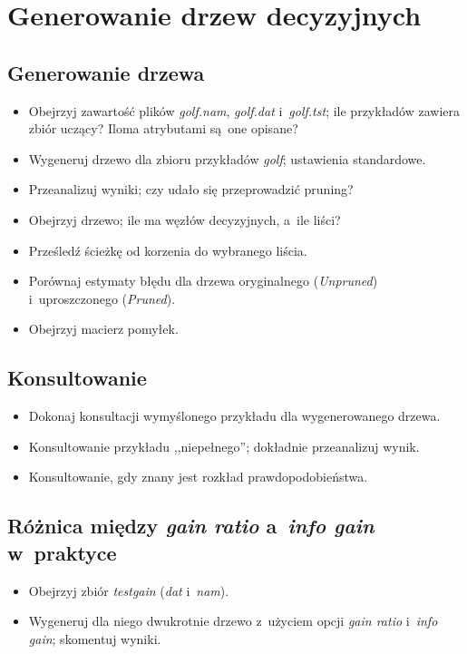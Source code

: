 \documentclass{article}
\begin{document}



\section{Generowanie drzew decyzyjnych}

\subsection{Generowanie drzewa}

\begin{itemize}
\item Obejrzyj zawartość plików \emph{golf.nam}, \emph{golf.dat} i~\emph{golf.tst}; ile przykładów zawiera zbiór uczący? Iloma atrybutami są~one opisane?
\item Wygeneruj drzewo dla zbioru przykładów \emph{golf}; ustawienia standardowe.
\item Przeanalizuj wyniki; czy udało się przeprowadzić pruning?
\item Obejrzyj drzewo; ile ma węzłów decyzyjnych, a~ile liści?
\item Prześledź ścieżkę od korzenia do wybranego liścia.
\item Porównaj estymaty błędu dla drzewa oryginalnego (\emph{Unpruned}) i~uproszczonego (\emph{Pruned}).
\item Obejrzyj macierz pomyłek.
\end{itemize}

\subsection{Konsultowanie}

\begin{itemize}
\item Dokonaj konsultacji wymyślonego przykładu dla wygenerowanego drzewa.
\item Konsultowanie przykładu ,,niepełnego''; dokładnie przeanalizuj wynik.
\item Konsultowanie, gdy znany jest rozkład prawdopodobieństwa.
\end{itemize}

\subsection{Różnica między \emph{gain ratio} a~\emph{info gain} w~praktyce}

\begin{itemize}
\item Obejrzyj zbiór \emph{testgain} (\emph{dat} i~\emph{nam}).
\item Wygeneruj dla niego dwukrotnie drzewo z~użyciem opcji \emph{gain ratio} i~\emph{info gain}; skomentuj wyniki.
\end{itemize}
\end{document}
